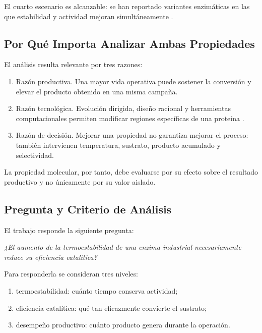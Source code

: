 El cuarto escenario es alcanzable: se han reportado variantes enzimáticas en las
que estabilidad y actividad mejoran simultáneamente
\citep{siddiqui_defying_2017,hou_tradeoff_2023}.

\subsection{Por Qué Importa Analizar Ambas Propiedades}
\label{subsec:justificacion}

El análisis resulta relevante por tres razones:

\begin{enumerate}
    \item Razón productiva. Una mayor vida operativa puede sostener la conversión
    y elevar el producto obtenido en una misma campaña.

    \item Razón tecnológica. Evolución dirigida, diseño racional y herramientas
    computacionales permiten modificar regiones específicas de una proteína
    \citep{siddiqui_defying_2017}.

    \item Razón de decisión. Mejorar una propiedad no garantiza mejorar el
    proceso: también intervienen temperatura, sustrato, producto acumulado y
    selectividad.
\end{enumerate}

La propiedad molecular, por tanto, debe evaluarse por su efecto sobre el
resultado productivo y no únicamente por su valor aislado.

\subsection{Pregunta y Criterio de Análisis}
\label{subsec:pregunta}

El trabajo responde la siguiente pregunta:

\begin{center}
    \textit{¿El aumento de la termoestabilidad de una enzima industrial
    necesariamente reduce su eficiencia catalítica?}
\end{center}

Para responderla se consideran tres niveles:

\begin{enumerate}
    \item termoestabilidad: cuánto tiempo conserva actividad;
    \item eficiencia catalítica: qué tan eficazmente convierte el sustrato;
    \item desempeño productivo: cuánto producto genera durante la operación.
\end{enumerate}

